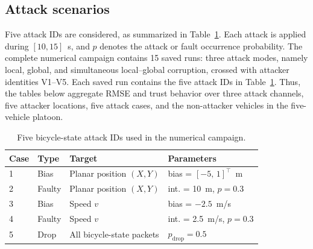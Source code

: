 \documentclass[journal,twoside]{IEEEtran}
\begin{document}
\subsection{Attack scenarios}\label{sec:attack_scenarios}
Five attack IDs are considered, as summarized in Table~\ref{tab:attack_mix}. Each attack is applied during $[10, 15]$~s, and $p$ denotes the attack or fault occurrence probability.
The complete numerical campaign contains 15 saved runs: three attack modes, namely local, global, and simultaneous local--global corruption, crossed with attacker identities V1--V5. Each saved run contains the five attack IDs in Table~\ref{tab:attack_mix}. Thus, the tables below aggregate RMSE and trust behavior over three attack channels, five attacker locations, five attack cases, and the non-attacker vehicles in the five-vehicle platoon.

\begin{table}[!ht]
\centering
\caption{Five bicycle-state attack IDs used in the numerical campaign.}
\label{tab:attack_mix}
\scriptsize
\begin{tabular}{p{0.7cm}p{1.35cm}p{2.0cm}p{3.0cm}}
\toprule
\textbf{Case} & \textbf{Type} & \textbf{Target} & \textbf{Parameters} \\
\midrule
1 & Bias & Planar position $(X,Y)$ & bias = $[-5,\,1]^\top$~m \\
2 & Faulty & Planar position $(X,Y)$ & int. = 10~m, $p = 0.3$ \\
3 & Bias & Speed $v$ & bias = $-2.5$~m/s \\
4 & Faulty & Speed $v$ & int. = 2.5~m/s, $p = 0.3$ \\
5 & Drop & All bicycle-state packets & $p_\text{drop} = 0.5$ \\
\bottomrule
\end{tabular}
\end{table}

\end{document}
